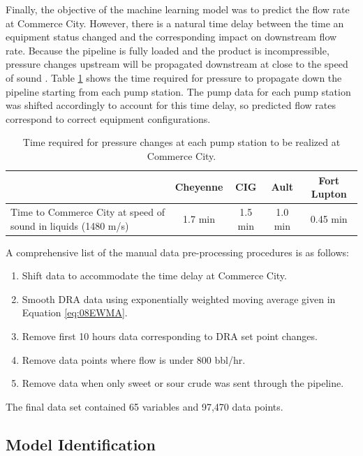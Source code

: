 Finally, the objective of the machine learning model was to predict the flow rate at Commerce City.  However, there is a natural time delay between the time an equipment status changed and the corresponding impact on downstream flow rate.  Because the pipeline is fully loaded and the product is incompressible, pressure changes upstream will be propagated downstream at close to the speed of sound \cite{fluid_mechanics}.  Table \ref{tab:08TimeToCC} shows the time required for pressure to propagate down the pipeline starting from each pump station.  The pump data for each pump station was shifted accordingly to account for this time delay, so predicted flow rates correspond to correct equipment configurations.  

\begin{table}[h]
    \centering
    {
    \begin{tabular}{ p{6cm} | c | c | c | c}
             &  Cheyenne & CIG & Ault & Fort Lupton \\
        \hline
        Time to Commerce City at speed of sound in liquids (1480 m/s) \cite{fluid_mechanics}
        &  1.7 min  &  1.5 min  &  1.0 min  &  0.45 min  \\
    \end{tabular}}
    \caption{Time required for pressure changes at each pump station to be realized at Commerce City.}
    \label{tab:08TimeToCC}
\end{table}

A comprehensive list of the manual data pre-processing procedures is as follows:
\begin{enumerate}
    \item Shift data to accommodate the time delay at Commerce City.
    \item Smooth DRA data using exponentially weighted moving average given in Equation \ref{eq:08EWMA}.  
    \item Remove first 10 hours data corresponding to DRA set point changes.
    \item Remove data points where flow is under 800 bbl/hr.
    \item Remove data when only sweet or sour crude was sent through the pipeline.
\end{enumerate}

The final data set contained 65 variables and 97,470 data points.

\subsection{Model Identification}
